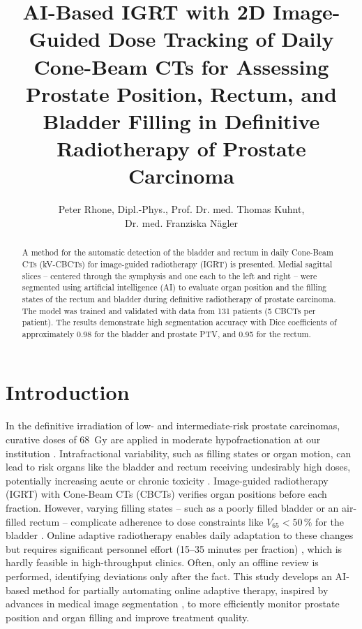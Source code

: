 \documentclass{article}
\begin{document}
\title{AI-Based IGRT with 2D Image-Guided Dose Tracking of Daily Cone-Beam CTs
for Assessing Prostate Position, Rectum, and Bladder Filling in Definitive
Radiotherapy of Prostate Carcinoma}
\author{\begin{minipage}{0.8\textwidth}\centering\small Peter Rhone,
Dipl.-Phys., Prof. Dr. med. Thomas Kuhnt, \\ Dr. med. Franziska
Nägler\end{minipage}}
\maketitle

\vspace{2cm}

\begin{abstract}
A method for the automatic detection of the bladder and rectum in daily
Cone-Beam CTs (kV-CBCTs) for image-guided radiotherapy (IGRT) is presented.
Medial sagittal slices – centered through the symphysis and one each to the left
and right – were segmented using artificial intelligence (AI) to evaluate organ
position and the filling states of the rectum and bladder during definitive
radiotherapy of prostate carcinoma. The model was trained and validated with
data from 131 patients (5 CBCTs per patient). The results demonstrate high
segmentation accuracy with Dice coefficients of approximately 0.98 for the
bladder and prostate PTV, and 0.95 for the rectum.  \end{abstract}

\section{Introduction}
In the definitive irradiation of low- and intermediate-risk prostate carcinomas,
curative doses of 68~Gy are applied in moderate hypofractionation at our
institution \citep{ethik2024}. Intrafractional variability, such as filling
states or organ motion, can lead to risk organs like the bladder and rectum
receiving undesirably high doses, potentially increasing acute or chronic
toxicity \citep{kupelian2007, quantec}. Image-guided radiotherapy (IGRT) with
Cone-Beam CTs (CBCTs) verifies organ positions before each fraction. However,
varying filling states – such as a poorly filled bladder or an air-filled rectum
– complicate adherence to dose constraints like \( V_{65} < 50\,\% \) for the
bladder \citep{wang2022, quantec}. Online adaptive radiotherapy enables daily
adaptation to these changes but requires significant personnel effort (15–35
minutes per fraction) \citep{byrne2022}, which is hardly feasible in
high-throughput clinics. Often, only an offline review is performed, identifying
deviations only after the fact. This study develops an AI-based method for
partially automating online adaptive therapy, inspired by advances in medical
image segmentation \citep{litjens2017}, to more efficiently monitor prostate
position and organ filling and improve treatment quality.
\end{document}
